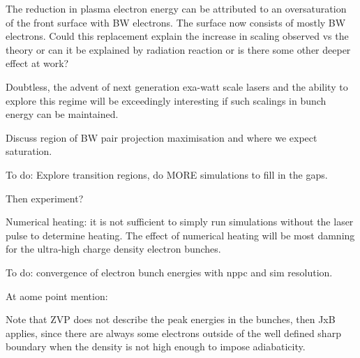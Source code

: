 The reduction in plasma electron energy can be attributed to an oversaturation of the front surface with BW electrons. The surface now consists of mostly BW electrons. Could this replacement explain the increase in scaling observed vs the theory or can it be explained by radiation reaction or is there some other deeper effect at work?

Doubtless, the advent of next generation exa-watt scale lasers and the ability to explore this regime will be exceedingly interesting if such scalings in bunch energy can be maintained.


Discuss region of BW pair projection maximisation and where we expect saturation.

To do: Explore transition regions, do MORE simulations to fill in the gaps.


Then experiment?

Numerical heating: it is not sufficient to simply run simulations without the laser pulse to determine heating. The effect of numerical heating will be most damning for the ultra-high charge density electron bunches.

To do: convergence of electron bunch energies with nppc and sim resolution.


At aome point mention:

Note that ZVP does not describe the peak energies in the bunches, then JxB applies, since there are always some electrons outside of the well defined sharp boundary when the density is not high enough to impose adiabaticity. 
